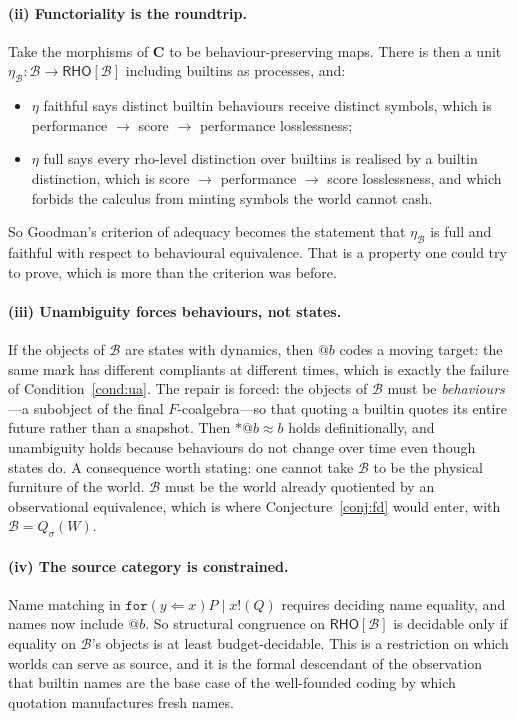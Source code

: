\documentclass[11pt,a4paper]{article}
\makeatletter
\theoremstyle{definition}
\theoremstyle{plain}
\theoremstyle{remark}
\newcommand{\rc}{\textup{rho}}
\newcommand{\RHO}{\mathsf{RHO}}
\newcommand{\Bee}{\mathcal{B}}
\newcommand{\Cat}{\mathbf{C}}
\newcommand{\quo}[1]{@#1}
\newcommand{\bisim}{\approx}
\newcommand{\Qs}{Q_{\sigma}}
\makeatother
\begin{document}
\paragraph{(ii) Functoriality is the roundtrip.} Take the morphisms of $\Cat$ to be
behaviour-preserving maps. There is then a unit $\eta_{\Bee} : \Bee \to \RHO[\Bee]$
including builtins as processes, and:
\begin{itemize}[leftmargin=1.6em]
\item $\eta$ faithful says distinct builtin behaviours receive distinct symbols, which is
performance $\to$ score $\to$ performance losslessness;
\item $\eta$ full says every \rc{}-level distinction over builtins is realised by a
builtin distinction, which is score $\to$ performance $\to$ score losslessness, and which
forbids the calculus from minting symbols the world cannot cash.
\end{itemize}
So Goodman's criterion of adequacy becomes the statement that $\eta_{\Bee}$ is full and
faithful with respect to behavioural equivalence. That is a property one could try to
prove, which is more than the criterion was before.

\paragraph{(iii) Unambiguity forces behaviours, not states.} If the objects of $\Bee$ are
states with dynamics, then $\quo{b}$ codes a moving target: the same mark has different
compliants at different times, which is exactly the failure of Condition~\ref{cond:ua}.
The repair is forced: the objects of $\Bee$ must be \emph{behaviours}---a subobject of the
final $F$-coalgebra---so that quoting a builtin quotes its entire future rather than a
snapshot. Then $*\quo{b} \bisim b$ holds definitionally, and unambiguity holds because
behaviours do not change over time even though states do. A consequence worth stating: one
cannot take $\Bee$ to be the physical furniture of the world. $\Bee$ must be the world
already quotiented by an observational equivalence, which is where
Conjecture~\ref{conj:fd} would enter, with $\Bee = \Qs(W)$.

\paragraph{(iv) The source category is constrained.} Name matching in
$\mathtt{for}(y \Leftarrow x)P \mid x!(Q)$ requires deciding name equality, and names now
include $\quo{b}$. So structural congruence on $\RHO[\Bee]$ is decidable only if equality
on $\Bee$'s objects is at least budget-decidable. This is a restriction on which worlds
can serve as source, and it is the formal descendant of the observation that builtin names
are the base case of the well-founded coding by which quotation manufactures fresh names.
\end{document}
